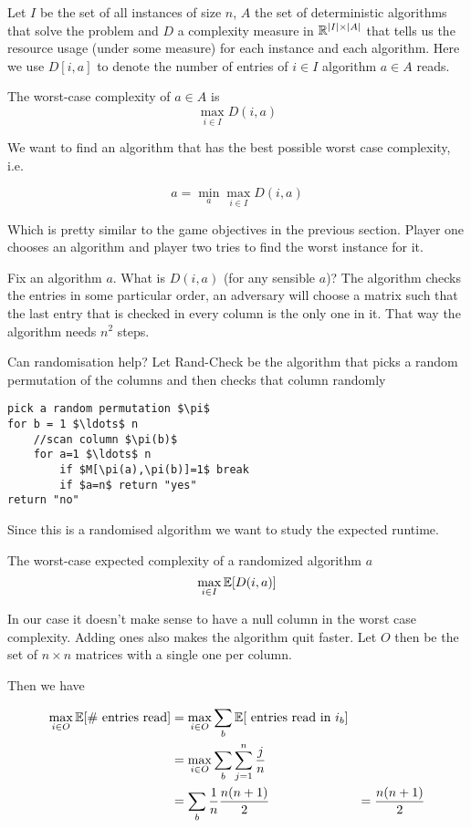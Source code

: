 Let $I$ be the set of all instances of size $n$, $A$ the set of deterministic algorithms that solve the problem and $D$ a complexity measure in $\mathbb{R}^{|I| \times |A|}$ that tells us the resource usage (under some measure) for each instance and each algorithm. Here we use $D[i,a]$ to denote the number of entries of $i\in I$ algorithm $a\in A$ reads.

\begin{Def} The worst-case complexity of $a\in A$ is 
\[\max_{i\in I} D(i,a)\]
\end{Def}

We want to find an algorithm that has the best possible worst case complexity, i.e.

\[a = \min_a \max_{i\in I} D(i,a)\]

Which is pretty similar to the game objectives in the previous section. Player one chooses an algorithm and player two tries to find the worst instance for it.

Fix an algorithm $a$. What is $D(i,a)$ (for any sensible $a$)? The algorithm checks the entries in some particular order, an adversary will choose a matrix such that the last entry that is checked in every column is the only one in it. That way the algorithm needs $n^2$ steps.

Can randomisation help? Let {\sc Rand-Check} be the algorithm that picks a random permutation of the columns and then checks that column randomly

\begin{lstlisting}
pick a random permutation $\pi$
for b = 1 $\ldots$ n
	//scan column $\pi(b)$
	for a=1 $\ldots$ n
		if $M[\pi(a),\pi(b)]=1$ break
		if $a=n$ return "yes"
return "no"
\end{lstlisting}

Since this is a randomised algorithm we want to study the expected runtime. 

\begin{Def} The worst-case expected complexity of a randomized algorithm $a$
\[\max_{i\in I} \mathbb{E}[D(i,a)]\]
\end{Def}

In our case it doesn't make sense to have a null column in the worst case complexity. Adding ones also makes the algorithm quit faster. Let $O$ then be the set of $n\times n$ matrices with a single one per column.

Then we have

\begin{align*}
\max_{i\in O} \mathbb{E}[\text{\# entries read}] &= \max_{i\in O} \sum_b \mathbb{E}[\text{ entries read in } i_b]\\
	&=\max_{i\in O}\sum_b \sum_{j=1}^n \frac jn\\
	&=\sum_b \frac 1n \frac{n(n+1)}{2} 
	&=\frac{n(n+1)}{2}
\end{align*}

